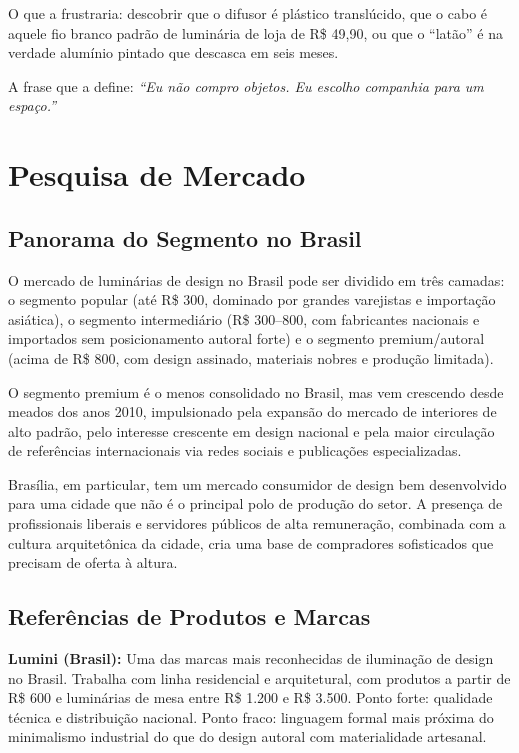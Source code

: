 \documentclass[
  12pt,
  a4paper,
  oneside,
  brazil
]{article}
\let\oldsection\section
\renewcommand{\section}{\clearpage\oldsection}
\begin{document}
O que a frustraria: descobrir que o difusor é plástico translúcido, que o cabo é
aquele fio branco padrão de luminária de loja de R\$ 49,90, ou que o ``latão'' é na
verdade alumínio pintado que descasca em seis meses.

A frase que a define: \textit{``Eu não compro objetos. Eu escolho companhia para
um espaço.''}

\section{Pesquisa de Mercado}

\subsection{Panorama do Segmento no Brasil}

O mercado de luminárias de design no Brasil pode ser dividido em três camadas: o
segmento popular (até R\$ 300, dominado por grandes varejistas e importação asiática),
o segmento intermediário (R\$ 300--800, com fabricantes nacionais e importados sem
posicionamento autoral forte) e o segmento premium/autoral (acima de R\$ 800, com
design assinado, materiais nobres e produção limitada).

O segmento premium é o menos consolidado no Brasil, mas vem crescendo desde meados
dos anos 2010, impulsionado pela expansão do mercado de interiores de alto padrão,
pelo interesse crescente em design nacional e pela maior circulação de referências
internacionais via redes sociais e publicações especializadas.

Brasília, em particular, tem um mercado consumidor de design bem desenvolvido para
uma cidade que não é o principal polo de produção do setor. A presença de profissionais
liberais e servidores públicos de alta remuneração, combinada com a cultura
arquitetônica da cidade, cria uma base de compradores sofisticados que precisam de
oferta à altura.

\subsection{Referências de Produtos e Marcas}

\noindent\textbf{Lumini (Brasil):} Uma das marcas mais reconhecidas de iluminação de
design no Brasil. Trabalha com linha residencial e arquitetural, com produtos a partir
de R\$ 600 e luminárias de mesa entre R\$ 1.200 e R\$ 3.500. Ponto forte: qualidade
técnica e distribuição nacional. Ponto fraco: linguagem formal mais próxima do
minimalismo industrial do que do design autoral com materialidade artesanal.
\end{document}
